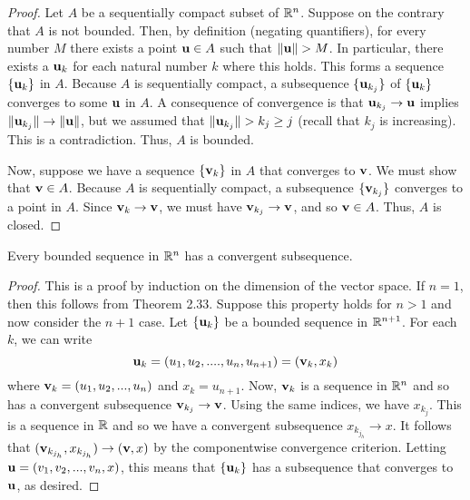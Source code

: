 \documentclass[letterpaper, twoside, 12pt]{book}
\begin{document}
\begin{proof}
    Let \(A\) be a sequentially compact subset of \(\mathbb R^n\). Suppose
    on the contrary that \(A\) is not bounded. Then, by definition
    (negating quantifiers), for every number \(M\) there exists a 
    point \(\mathbf u \in A\) such that \(\|\mathbf u\| > M \). In particular,
    there exists a \(\mathbf u_k\) for each natural number \(k\) where
    this holds. This forms a sequence \(\{\mathbf u_k\}\) in \(A\). 
    Because \(A\) is sequentially compact, a subsequence \(\{\mathbf u_{k_j}\}\)
    of \(\{\mathbf u_k\}\) converges to some \(\mathbf u\) in \(A\).
    A consequence of convergence is that \(\mathbf u_{k_j} \to \mathbf u\) implies 
    \(\|\mathbf u_{k_j}\| \to \|\mathbf u\|\), but we assumed that
    \(\|\mathbf u_{k_j}\| > k_j \geq j\) (recall that \(k_j\) is increasing).
    This is a contradiction. Thus, \(A\) is bounded.

    Now, suppose we have a sequence \(\{\mathbf v_k\}\) in \(A\) that converges
    to \(\mathbf v\). We must show that \(\mathbf v \in A\). Because \(A\)
    is sequentially compact, a subsequence \(\{\mathbf v_{k_j}\}\) converges
    to a point in \(A\). Since \(\mathbf v_k \to \mathbf v\), we must have
    \(\mathbf v_{k_j} \to \mathbf v\), and so \(\mathbf v \in A\). Thus, \(A\)
    is closed.
\end{proof}

\begin{theorem}[11.17]
  Every bounded sequence in \(\mathbb R^n\) has a convergent subsequence.
\end{theorem}

\begin{proof}
    This is a proof by induction on the dimension of the vector space.
    If \(n = 1\), then this follows from Theorem 2.33. Suppose this
    property holds for \(n > 1\) and now consider the \(n + 1\) case.
    Let \(\{\mathbf u_k\}\) be a bounded sequence in \(\mathbb R^{n+1}\).
    For each \(k\), we can write
    \[ \mathbf u_k = (u_1, u_2, ...., u_n, u_{n+1}) = (\mathbf v_k, x_k) \]
    where \(\mathbf v_k = (u_1, u_2, ..., u_n)\) and \(x_k = u_{n+1}\).  
    Now, \(\mathbf v_k\) is a sequence in \(\mathbb R^n\) and so 
    has a convergent subsequence \(\mathbf v_{k_j} \to \mathbf v\). 
    Using the same indices, we have \(x_{k_j}\). This is a sequence in \(\mathbb R\)
    and so we have a convergent subsequence \(x_{k_{j_h}} \to x\). 
    It follows that \((\mathbf v_{k_{j_h}}, x_{k_{j_h}}) \to (\mathbf v, x)\)
    by the componentwise convergence criterion. Letting \(\mathbf u = (v_1, v_2, ..., v_n, x)\),
    this means that \(\{\mathbf u_k\}\) has a subsequence that converges
    to \(\mathbf u\), as desired.
\end{proof}
\end{document}
